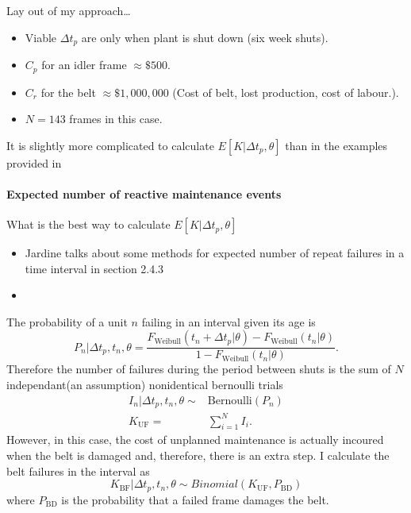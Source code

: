 Lay out of my approach\dots
\begin{itemize}
  \item Viable $\Delta t_p$ are only when plant is shut down (six week shuts).
  \item $C_p$ for an idler frame $\approx\$500$.
  \item $C_r$ for the belt $\approx\$1,000,000$ (Cost of belt, lost production, cost of labour.).
  \item $N = 143$ frames in this case. 
\end{itemize}
It is slightly more complicated to calculate $E[K|\Delta t_p,\theta]$ than in the examples provided in \citet{jardine2013}

\paragraph*{Expected number of reactive maintenance events}

What is the best way to calculate $E[K|\Delta t_p,\theta]$
\begin{itemize}
  \item Jardine talks about some methods for expected number of repeat failures in a time interval in section 2.4.3
  \item 
\end{itemize}

The probability of a unit $n$ failing in an interval given its age is
\begin{equation*}
  P_{n}|\Delta t_p, t_n, \theta = \frac{F_{\text{Weibull}}(t_n + \Delta t_p|\theta) - F_{\text{Weibull}}(t_n|\theta)}{1 - F_{\text{Weibull}}(t_n|\theta)}.
\end{equation*}
Therefore the number of failures during the period between shuts is the sum of $N$ independant(an assumption) nonidentical bernoulli trials
\begin{align*}
  I_n|\Delta t_p, t_n, \theta \sim & \mbox{Bernoulli}(P_{n}) \\
  K_{\text{UF}}                  = & \sum^N_{i = 1} I_i.
\end{align*}
However, in this case, the cost of unplanned maintenance is actually incoured when the belt is damaged and, therefore, there is an extra step. I calculate the belt failures in the interval as
\begin{equation*}
  K_{\text{BF}}|\Delta t_p, t_n, \theta \sim Binomial(K_{\text{UF}}, P_{\text{BD}})
\end{equation*}
where $P_{\text{BD}}$ is the probability that a failed frame damages the belt.

